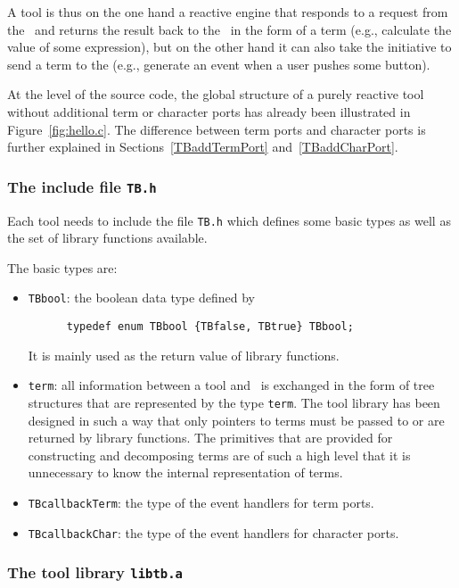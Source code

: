 A tool is thus on the one hand a reactive engine that responds to a
request from the \TB\ and returns the result back to the \TB\ in the
form of a term (e.g., calculate the value of some expression), but on
the other hand it can also take the initiative to send a term to the
\TB  (e.g., generate an event when a user pushes some button).

At the level of the source code, the global structure of a purely
reactive tool without additional term or character ports
has already
been illustrated in Figure~\ref{fig:hello.c}.
The difference between term ports and character ports is further explained in 
Sections~\ref{TBaddTermPort} and~\ref{TBaddCharPort}.

\subsubsection{The include file {\tt TB.h}}

Each tool needs to include the file {\tt TB.h}
which defines some basic types as well as the set
of library functions available.

The basic types are:
\begin{itemize}
\item {\tt TBbool}: the boolean data type defined by
\begin{verbatim}
      typedef enum TBbool {TBfalse, TBtrue} TBbool;
\end{verbatim}
It is mainly used as the return value of library functions.

\item {\tt term}: all information between a tool and \TB\ is exchanged
in the form of tree structures that are represented by the type
{\tt term}. The tool library has been designed in such a way that
only pointers to terms must be passed to or are returned by library
functions. The primitives that are provided for constructing
and decomposing terms are of such a high level that it is unnecessary
to know the internal representation of terms.

\item {\tt TBcallbackTerm}: the type of the event handlers for term ports.
\item {\tt TBcallbackChar}: the type of the event handlers for character ports.
\end{itemize}

\subsubsection{The tool library {\tt libtb.a}}

